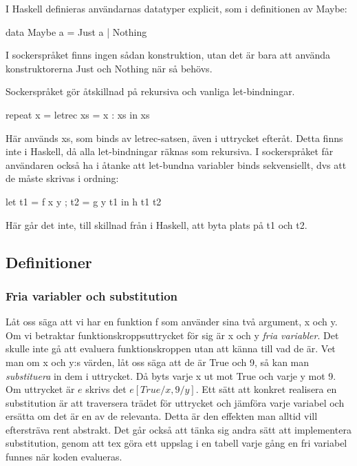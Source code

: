 \documentclass[Rapport]{subfiles}
\begin{document}
    I Haskell definieras användarnas datatyper explicit, som i definitionen
av Maybe:
\begin{codeEx}
data Maybe a = Just a | Nothing
\end{codeEx}
I sockerspråket finns ingen sådan konstruktion, utan det är bara att använda
konstruktorerna Just och Nothing när så behövs.


Sockerspråket gör åtskillnad på rekursiva och vanliga let-bindningar. 
\begin{codeEx}
repeat x = letrec xs = x : xs in xs  
\end{codeEx}
Här används xs, som binds av letrec-satsen, även i uttrycket efteråt. Detta
finns inte i Haskell, då alla let-bindningar räknas som rekursiva. I
sockerspråket får användaren också ha i åtanke att let-bundna variabler binds
sekvensiellt, dvs att de måste skrivas i ordning:
\begin{codeEx}
let { t1 = f x y
    ; t2 = g y t1
    }
in  h t1 t2
\end{codeEx}
Här går det inte, till skillnad från i Haskell, att byta plats på t1 och t2.


\subsection{Definitioner}

\subsubsection{Fria variabler och substitution}
Låt oss säga att vi har en funktion f som använder sina två 
argument, x och y. Om vi betraktar funktionskroppsuttrycket för sig är x och y 
\emph{fria variabler}. Det skulle inte gå att evaluera funktionskroppen utan
att känna till vad de är. Vet man om x och y:s värden, låt oss säga att de är
True och 9, så kan man \emph{substituera} in dem i uttrycket. Då byts varje
x ut mot True och varje y mot 9. Om uttrycket är $e$ skrivs det $e[True/x, 9/y]$. 
    Ett sätt att konkret realisera en substitution är att traversera trädet
för uttrycket och jämföra varje variabel och ersätta om det är en av de
relevanta. Detta är den effekten man alltid vill eftersträva rent abstrakt.
Det går också att tänka sig andra sätt att implementera substitution, genom
att tex göra ett uppslag i en tabell varje gång en fri variabel funnes när
koden evalueras. 
\end{document}
